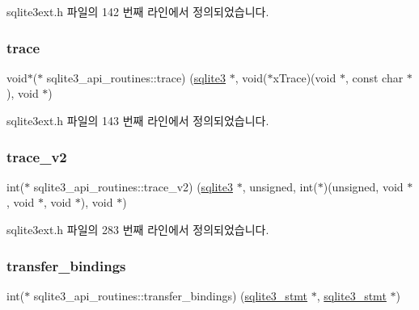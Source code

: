 sqlite3ext.\+h 파일의 142 번째 라인에서 정의되었습니다.

\mbox{\label{structsqlite3__api__routines_ad747f6107d6a8edaefebc52cce2679d3}} 
\subsubsection{\texorpdfstring{trace}{trace}}
{\footnotesize\ttfamily void$\ast$($\ast$ sqlite3\+\_\+api\+\_\+routines\+::trace) (\hyperlink{sqlite3_8h_a0ef6f2646262c8a9b24368d8ac140f69}{sqlite3} $\ast$, void($\ast$x\+Trace)(void $\ast$, const char $\ast$), void $\ast$)}



sqlite3ext.\+h 파일의 143 번째 라인에서 정의되었습니다.

\mbox{\label{structsqlite3__api__routines_a1e15157983af5536336892fdc5707275}} 
\subsubsection{\texorpdfstring{trace\+\_\+v2}{trace\_v2}}
{\footnotesize\ttfamily int($\ast$ sqlite3\+\_\+api\+\_\+routines\+::trace\+\_\+v2) (\hyperlink{sqlite3_8h_a0ef6f2646262c8a9b24368d8ac140f69}{sqlite3} $\ast$, unsigned, int($\ast$)(unsigned, void $\ast$, void $\ast$, void $\ast$), void $\ast$)}



sqlite3ext.\+h 파일의 283 번째 라인에서 정의되었습니다.

\mbox{\label{structsqlite3__api__routines_ab3c5b0d61682151cd3c8419eb4c1ca13}} 
\subsubsection{\texorpdfstring{transfer\+\_\+bindings}{transfer\_bindings}}
{\footnotesize\ttfamily int($\ast$ sqlite3\+\_\+api\+\_\+routines\+::transfer\+\_\+bindings) (\hyperlink{sqlite3_8h_af2a033da1327cdd77f0a174a09aedd0c}{sqlite3\+\_\+stmt} $\ast$, \hyperlink{sqlite3_8h_af2a033da1327cdd77f0a174a09aedd0c}{sqlite3\+\_\+stmt} $\ast$)}



